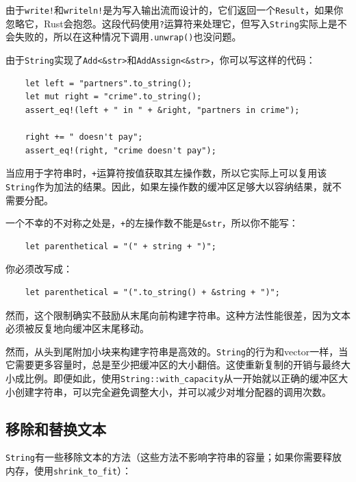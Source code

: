 由于\texttt{write!}和\texttt{writeln!}是为写入输出流而设计的，它们返回一个\texttt{Result}，如果你忽略它，Rust会抱怨。这段代码使用\texttt{?}运算符来处理它，但写入\texttt{String}实际上是不会失败的，所以在这种情况下调用\texttt{.unwrap()}也没问题。

由于\texttt{String}实现了\texttt{Add<\&str>}和\texttt{AddAssign<\&str>}，你可以写这样的代码：
\begin{verbatim}
    let left = "partners".to_string();
    let mut right = "crime".to_string();
    assert_eq!(left + " in " + &right, "partners in crime");

    right += " doesn't pay";
    assert_eq!(right, "crime doesn't pay");
\end{verbatim}

当应用于字符串时，\texttt{+}运算符按值获取其左操作数，所以它实际上可以复用该\texttt{String}作为加法的结果。因此，如果左操作数的缓冲区足够大以容纳结果，就不需要分配。

一个不幸的不对称之处是，\texttt{+}的左操作数不能是\texttt{\&str}，所以你不能写：
\begin{verbatim}
    let parenthetical = "(" + string + ")";
\end{verbatim}

你必须改写成：
\begin{verbatim}
    let parenthetical = "(".to_string() + &string + ")";
\end{verbatim}

然而，这个限制确实不鼓励从末尾向前构建字符串。这种方法性能很差，因为文本必须被反复地向缓冲区末尾移动。

然而，从头到尾附加小块来构建字符串是高效的。\texttt{String}的行为和vector一样，当它需要更多容量时，总是至少把缓冲区的大小翻倍。这使重新复制的开销与最终大小成比例。即便如此，使用\texttt{String::with\_capacity}从一开始就以正确的缓冲区大小创建字符串，可以完全避免调整大小，并可以减少对堆分配器的调用次数。

\subsection{移除和替换文本}

\texttt{String}有一些移除文本的方法（这些方法不影响字符串的容量；如果你需要释放内存，使用\texttt{shrink\_to\_fit}）：



